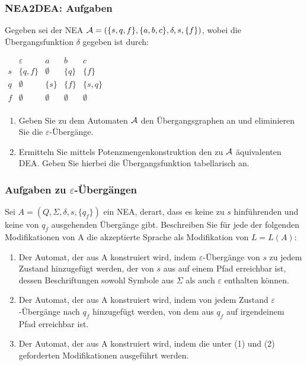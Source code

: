 \documentclass{beamer}
\begin{document}
{\begin{frame}
\end{frame}
\begin{frame}
	\frametitle{NEA2DEA: Aufgaben}
Gegeben sei der NEA ${\cal A}=(\{s,q,f\},\{a,b,c\},\delta,s,\{f\})$, wobei
die Übergangsfunktion $\delta$ gegeben ist durch:
\begin{center}
$\begin{array}{r|cccc}
&\varepsilon & a & b & c\\\hline
s & \{q,f\} & \emptyset & \{q\} &\{f\}\\
q &  \emptyset & \{s\} & \{f\} & \{s,q\}\\
f & \emptyset & \emptyset &  \emptyset &  \emptyset\\
\end{array}$
\end{center}
\begin{enumerate}
\item Geben Sie zu dem Automaten ${\cal A}$ den Übergangsgraphen an und eliminieren
Sie die $\varepsilon$-Übergänge.
\item Ermitteln Sie mittels Potenzmengenkonstruktion den zu ${\cal A}$ äquivalenten
DEA. Geben Sie hierbei die Übergangsfunktion tabellarisch an.
\end{enumerate}
\end{frame}
\begin{frame}	
\frametitle{Aufgaben zu \(\varepsilon\)-Übergängen}
Sei $A=(Q,\Sigma, \delta, s, \{q_f\})$ ein NEA, derart, dass es keine zu $s$ hinführenden und keine von $q_f$ ausgehenden Übergänge gibt. Beschreiben Sie für jede der folgenden Modifikationen von A die akzeptierte Sprache als Modifikation von $L=L(A)$:
\begin{enumerate}
\item Der Automat, der aus A konstruiert wird, indem $\varepsilon$-Übergänge von $s$ zu jedem Zustand hinzugefügt werden, der von $s$ aus auf einem Pfad erreichbar ist, dessen Beschriftungen sowohl Symbole aus $\Sigma$ als auch $\varepsilon$ enthalten können.
\item Der Automat, der aus A konstruiert wird, indem von jedem Zustand $\varepsilon$-Übergänge nach $q_f$ hinzugefügt werden, von dem aus $q_f$ auf irgendeinem Pfad erreichbar ist.
\item Der Automat, der aus A konstruiert wird, indem die unter (1) und (2) geforderten Modifikationen ausgeführt werden.
\end{enumerate}

\end{frame}

}
\end{document}
